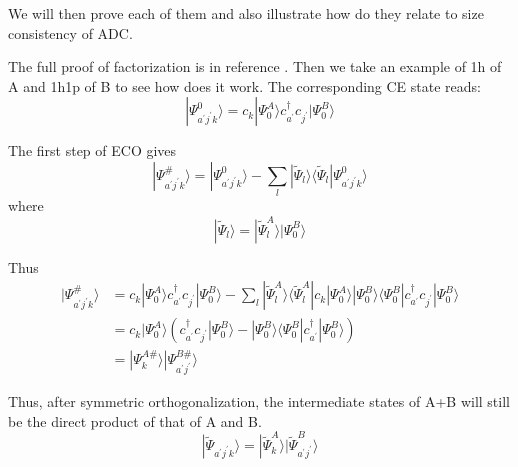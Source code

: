We will then prove each of them and also illustrate how do they relate to size consistency of ADC.

The full proof of factorization is in reference \cite{sizeproof}.
Then we take an example of 1h of A and 1h1p of B to see how does it work.
The corresponding CE state reads:
\begin{equation}
	| \Psi_{a^{\prime} j^{\prime} k}^{0} \rangle=c_{k} | \Psi_{0}^{A} \rangle c_{a^{\prime}}^{\dagger} c_{j^{\prime}} | \Psi_{0}^{B} \rangle
\end{equation}

The first step of ECO gives
\begin{equation}
	| \Psi_{a^{\prime} j^{\prime} k}^{\#} \rangle=| \Psi_{a^{\prime} j^{\prime} k}^{0} \rangle-\sum_{l} | \tilde{\Psi}_{l} \rangle\langle\tilde{\Psi}_{l} | \Psi_{a^{\prime} j^{\prime} k}^{0}\rangle
\end{equation}
where
\begin{equation}
	| \tilde{\Psi}_{l} \rangle=| \tilde{\Psi}_{l}^{A} \rangle | \Psi_{0}^{B} \rangle
\end{equation}

Thus
\begin{equation}
	\begin{aligned} 
		| \Psi_{a^{\prime} j^{\prime} k}^{\#} \rangle 
		&=c_{k} | \Psi_{0}^{A} \rangle c_{a^{\prime}}^{\dagger} c_{j^{\prime}} | \Psi_{0}^{B} \rangle-\sum_{l} | \tilde{\Psi}_{l}^{A} \rangle\langle\tilde{\Psi}_{l}^{A}|c_{k}| \Psi_{0}^{A}\rangle | \Psi_{0}^{B} \rangle\langle\Psi_{0}^{B}|c_{a^{\prime}}^{\dagger} c_{j^{\prime}}| \Psi_{0}^{B}\rangle 
		\\ 
		&= c_{k} | \Psi_{0}^{A} \rangle\left(c_{a^{\prime}}^{\dagger} c_{j^{\prime}} | \Psi_{0}^{B}\rangle-| \Psi_{0}^{B} \rangle\langle\Psi_{0}^{B}|c_{a^{\prime}}^{\dagger}| \Psi_{0}^{B}\rangle \right)
		\\
		&=| \Psi_{k}^{A \#} \rangle | \Psi_{a^{\prime} j^{\prime}}^{B \#} \rangle
	\end{aligned}
\end{equation}

Thus, after symmetric orthogonalization, the intermediate states of A+B will still be the direct product of that of A and B.
\begin{equation}
	| \tilde{\Psi}_{a^{\prime} j^{\prime} k} \rangle=| \tilde{\Psi}_{k}^{A} \rangle | \tilde{\Psi}_{a^{\prime} j^{\prime}}^{B} \rangle
\end{equation}

